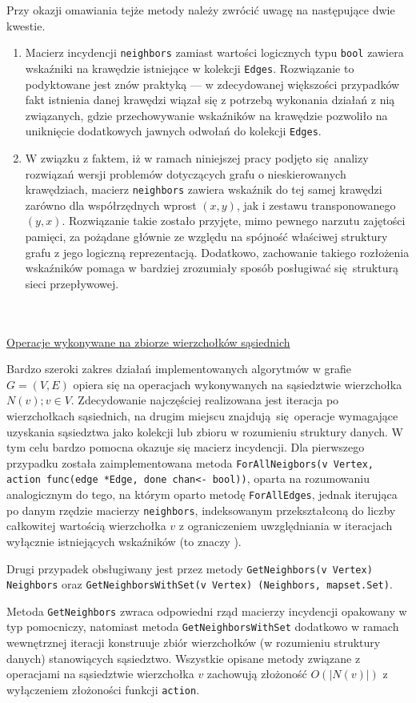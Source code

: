 {{      Przy okazji omawiania tejże metody należy zwrócić uwagę na następujące dwie kwestie.
      \begin{enumerate}
        \item Macierz incydencji \texttt{neighbors} zamiast wartości logicznych typu \texttt{bool} zawiera wskaźniki na krawędzie istniejące w kolekcji \texttt{Edges}.
        Rozwiązanie to podyktowane jest znów praktyką --- w zdecydowanej większości przypadków fakt istnienia danej krawędzi wiązał się z potrzebą wykonania działań z nią związanych, gdzie przechowywanie wskaźników na krawędzie pozwoliło na uniknięcie dodatkowych jawnych odwołań do kolekcji \texttt{Edges}.
        \item W związku z faktem, iż w ramach niniejszej pracy podjęto się analizy rozwiązań wersji problemów dotyczących grafu o nieskierowanych krawędziach, macierz \texttt{neighbors} zawiera wskaźnik do tej samej krawędzi zarówno dla współrzędnych wprost $(x, y)$, jak i zestawu transponowanego $(y, x)$.
        Rozwiązanie takie zostało przyjęte, mimo pewnego narzutu zajętości pamięci, za pożądane głównie ze względu na spójność właściwej struktury grafu z jego logiczną reprezentacją.
        Dodatkowo, zachowanie takiego rozłożenia wskaźników pomaga w bardziej zrozumiały sposób posługiwać się strukturą sieci przepływowej.
      \end{enumerate}
  }
  \\\\\underline{Operacje wykonywane na zbiorze wierzchołków sąsiednich}\\
  \par{
    Bardzo szeroki zakres działań implementowanych algorytmów w grafie $G=(V,E)$ opiera się na operacjach wykonywanych na sąsiedztwie wierzchołka $N(v); v \in V$.
    Zdecydowanie najczęściej realizowana jest iteracja po wierzchołkach sąsiednich, na drugim miejscu znajdują się operacje wymagające uzyskania sąsiedztwa jako kolekcji lub zbioru w rozumieniu struktury danych.
    W tym celu bardzo pomocna okazuje się macierz incydencji.
    Dla pierwszego przypadku została zaimplementowana metoda \texttt{ForAllNeigbors(v Vertex, action func(edge *Edge, done chan<- bool))}, oparta na rozumowaniu analogicznym do tego, na którym oparto metodę \texttt{ForAllEdges}, jednak iterująca po danym rzędzie macierzy \texttt{neighbors}, indeksowanym przekształconą do liczby całkowitej wartością wierzchołka $v$ z ograniczeniem uwzględniania w iteracjach wyłącznie istniejących wskaźników (to znaczy ).

    Drugi przypadek obsługiwany jest przez metody \texttt{GetNeighbors(v Vertex) Neighbors} oraz \texttt{GetNeighborsWithSet(v Vertex) (Neighbors, mapset.Set)}.

    Metoda \texttt{GetNeighbors} zwraca odpowiedni rząd macierzy incydencji opakowany w typ pomocniczy, natomiast metoda \texttt{GetNeighborsWithSet} dodatkowo w ramach wewnętrznej iteracji konstruuje zbiór wierzchołków (w rozumieniu struktury danych) stanowiących sąsiedztwo.
    Wszystkie opisane metody związane z operacjami na sąsiedztwie wierzchołka $v$ zachowują złożoność $O(|N(v)|)$ z wyłączeniem złożoności funkcji \texttt{action}.
  }
}